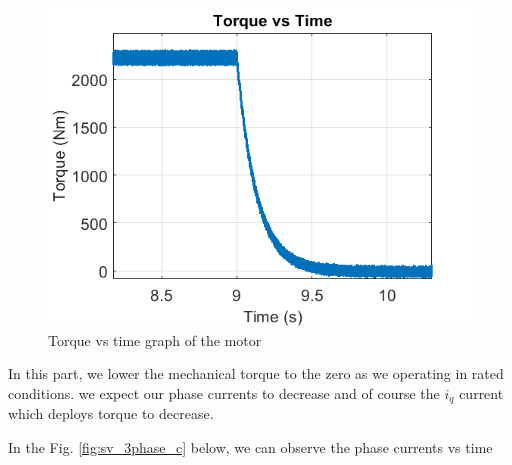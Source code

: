 \begin{center}
\begin{figure}[H]
\centering
\includegraphics [width= 10 cm]{figs/sv_tl0_torque.png}
\caption{Torque vs time graph of the motor}
\label{fig:sv_tl0_torque}
\end{figure}
\end{center}

In this part, we lower the mechanical torque to the zero as we operating in rated conditions. we expect our phase currents to decrease and of course the $i_q$ current which deploys torque to decrease. 

In the Fig. \ref{fig:sv_3phase_c} below, we can observe the phase currents vs time
        
